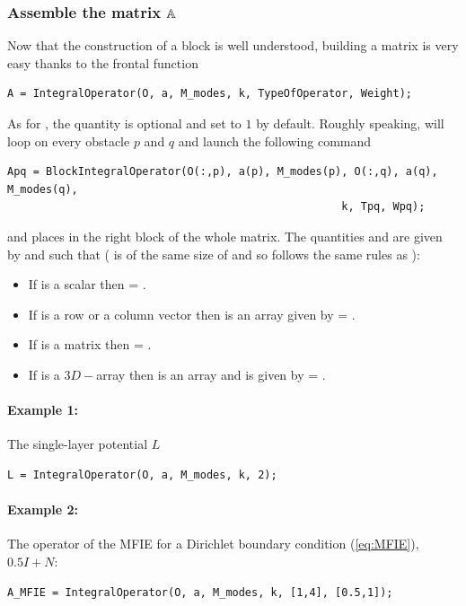 \subsubsection{Assemble the matrix ${\mathbb{A}}$}

Now that the construction of a block is well understood, building a matrix is very easy thanks to the frontal function
\begin{lstlisting}
A = IntegralOperator(O, a, M_modes, k, TypeOfOperator, Weight);
\end{lstlisting}
As for , the quantity  is optional and set to $1$ by default. Roughly speaking,  will loop on every obstacle $p$ and $q$ and launch the following command
\begin{lstlisting}
Apq = BlockIntegralOperator(O(:,p), a(p), M_modes(p), O(:,q), a(q), M_modes(q), 
                                                    k, Tpq, Wpq);
\end{lstlisting}
and places  in the right block of the whole matrix. The quantities  and  are given by  and  such that ( is of the same size of  and so  follows the same rules as ):
\begin{itemize}
\item If  is a scalar then  = . 
\item If  is a row or a column vector then  is an array given by  = . 
\item If  is a matrix then  = . 
\item If  is a $3D-$array then  is an array and is given by  = . 
\end{itemize}

\paragraph{Example 1:} The single-layer potential $L$
\begin{lstlisting}
L = IntegralOperator(O, a, M_modes, k, 2);
\end{lstlisting}
\paragraph{Example 2:} The operator of the MFIE for a Dirichlet boundary condition (\ref{eq:MFIE}), $0.5I + N$:
\begin{lstlisting}
A_MFIE = IntegralOperator(O, a, M_modes, k, [1,4], [0.5,1]);
\end{lstlisting}
